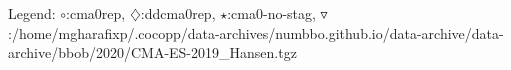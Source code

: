Legend: {\color{NavyBlue}$\circ$}:cma0rep, {\color{Magenta}$\diamondsuit$}:ddcma0rep, {\color{Orange}$\star$}:cma0-no-stag, {\color{CornflowerBlue}$\triangledown$}:/home/mgharafixp/.cocopp/data-archives/numbbo.github.io/data-archive/data-archive/bbob/2020/CMA-ES-2019\_Hansen.tgz